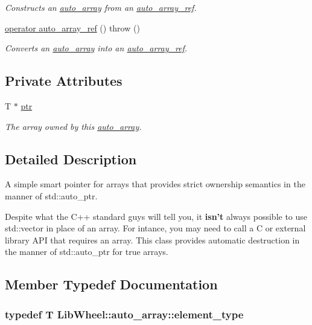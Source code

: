 \begin{DoxyCompactItemize}
\begin{DoxyCompactList}\small\item\em \-Constructs an \hyperlink{classLibWheel_1_1auto__array}{auto\-\_\-array} from an \hyperlink{structLibWheel_1_1auto__array_1_1auto__array__ref}{auto\-\_\-array\-\_\-ref}. \end{DoxyCompactList}\item 
\hyperlink{classLibWheel_1_1auto__array_abe2c9cfaad5f1f4355b14dc3327f97fd}{operator auto\-\_\-array\-\_\-ref} ()  throw ()
\begin{DoxyCompactList}\small\item\em \-Converts an \hyperlink{classLibWheel_1_1auto__array}{auto\-\_\-array} into an \hyperlink{structLibWheel_1_1auto__array_1_1auto__array__ref}{auto\-\_\-array\-\_\-ref}. \end{DoxyCompactList}\end{DoxyCompactItemize}
\subsection*{\-Private \-Attributes}
\begin{DoxyCompactItemize}
\item 
\-T $\ast$ \hyperlink{classLibWheel_1_1auto__array_a8b80daaf7ff9507e9723877a4ab933e8}{ptr}
\begin{DoxyCompactList}\small\item\em \-The array owned by this \hyperlink{classLibWheel_1_1auto__array}{auto\-\_\-array}. \end{DoxyCompactList}\end{DoxyCompactItemize}


\subsection{\-Detailed \-Description}
\-A simple smart pointer for arrays that provides strict ownership semantics in the manner of std\-::auto\-\_\-ptr. 

\-Despite what the \-C++ standard guys will tell you, it {\bfseries isn't} always possible to use std\-::vector in place of an array. \-For intance, you may need to call a \-C or external library \-A\-P\-I that requires an array. \-This class provides automatic destruction in the manner of std\-::auto\-\_\-ptr for true arrays. 

\subsection{\-Member \-Typedef \-Documentation}
\hypertarget{classLibWheel_1_1auto__array_a8c06b91597d32a42388eaad80ae5f656}{
\subsubsection[{element\-\_\-type}]{\setlength{\rightskip}{0pt plus 5cm}typedef \-T {\bf \-Lib\-Wheel\-::auto\-\_\-array\-::element\-\_\-type}}}
\label{classLibWheel_1_1auto__array_a8c06b91597d32a42388eaad80ae5f656}


